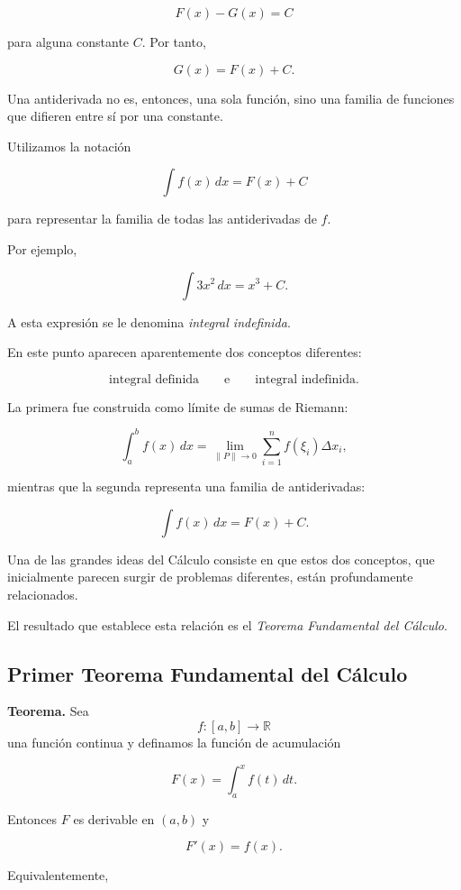 \documentclass[12pt]{article}
\begin{document}
\[
F(x)-G(x)=C
\]

para alguna constante $C$. Por tanto,

\[
\boxed{
G(x)=F(x)+C.
}
\]

Una antiderivada no es, entonces, una sola función, sino una familia de
funciones que difieren entre sí por una constante.

Utilizamos la notación

\[
\boxed{
\int f(x)\,dx=F(x)+C
}
\]

para representar la familia de todas las antiderivadas de $f$.

Por ejemplo,

\[
\boxed{
\int 3x^2\,dx=x^3+C.
}
\]

A esta expresión se le denomina \emph{integral indefinida}.

En este punto aparecen aparentemente dos conceptos diferentes:

\[
\text{integral definida}
\qquad\text{e}\qquad
\text{integral indefinida}.
\]

La primera fue construida como límite de sumas de Riemann:

\[
\int_a^b f(x)\,dx
=
\lim_{\|P\|\to0}
\sum_{i=1}^{n}f(\xi_i)\Delta x_i,
\]

mientras que la segunda representa una familia de antiderivadas:

\[
\int f(x)\,dx=F(x)+C.
\]

Una de las grandes ideas del Cálculo consiste en que estos dos conceptos,
que inicialmente parecen surgir de problemas diferentes, están
profundamente relacionados.

El resultado que establece esta relación es el
\emph{Teorema Fundamental del Cálculo}.

\subsection{Primer Teorema Fundamental del Cálculo}

\textbf{Teorema.}
Sea
\[
f:[a,b]\longrightarrow\mathbb{R}
\]
una función continua y definamos la función de acumulación

\[
F(x)=\int_a^x f(t)\,dt.
\]

Entonces $F$ es derivable en $(a,b)$ y

\[
\boxed{
F'(x)=f(x).
}
\]

Equivalentemente,
\end{document}
